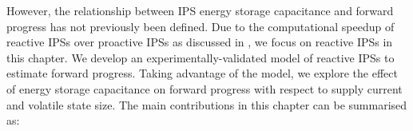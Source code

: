 
However, the relationship between IPS energy storage capacitance and forward progress has not previously been defined.
Due to the computational speedup of reactive IPSs over proactive IPSs as discussed in , we focus on reactive IPSs in this chapter. 
We develop an experimentally-validated model of reactive IPSs to estimate forward progress. 
Taking advantage of the model, we explore the effect of energy storage capacitance on forward progress with respect to supply current and volatile state size. 
The main contributions in this chapter can be summarised as:
